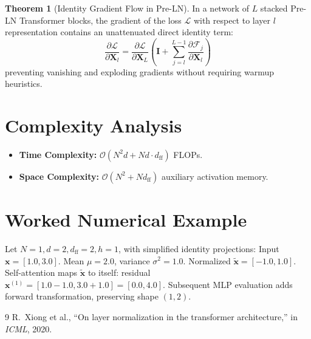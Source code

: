 \documentclass[11pt,a4paper]{article}
\theoremstyle{definition}
\newtheorem{theorem}{Theorem}[section]
\begin{document}
\begin{theorem}[Identity Gradient Flow in Pre-LN]
In a network of $L$ stacked Pre-LN Transformer blocks, the gradient of the loss $\mathcal{L}$ with respect to layer $l$ representation contains an unattenuated direct identity term:
\begin{equation}
\frac{\partial \mathcal{L}}{\partial \mathbf{X}_l} = \frac{\partial \mathcal{L}}{\partial \mathbf{X}_L} \left( \mathbf{I} + \sum_{j=l}^{L-1} \frac{\partial \mathcal{F}_j}{\partial \mathbf{X}_l} \right)
\end{equation}
preventing vanishing and exploding gradients without requiring warmup heuristics.
\end{theorem}

\section{Complexity Analysis}
\begin{itemize}
    \item \textbf{Time Complexity:} $\mathcal{O}(N^2 d + N d \cdot d_{\text{ff}})$ FLOPs.
    \item \textbf{Space Complexity:} $\mathcal{O}(N^2 + N d_{\text{ff}})$ auxiliary activation memory.
\end{itemize}

\section{Worked Numerical Example}
Let $N = 1, d = 2, d_{\text{ff}} = 2, h = 1$, with simplified identity projections:
Input $\mathbf{x} = [1.0, 3.0]$. Mean $\mu = 2.0$, variance $\sigma^2 = 1.0$.
Normalized $\tilde{\mathbf{x}} = [-1.0, 1.0]$.
Self-attention maps $\tilde{\mathbf{x}}$ to itself: residual $\mathbf{x}^{(1)} = [1.0 - 1.0, 3.0 + 1.0] = [0.0, 4.0]$.
Subsequent MLP evaluation adds forward transformation, preserving shape $(1, 2)$.

\begin{thebibliography}{9}
 R.~Xiong et al., ``On layer normalization in the transformer architecture,'' in \emph{ICML}, 2020.
\end{thebibliography}
\end{document}
